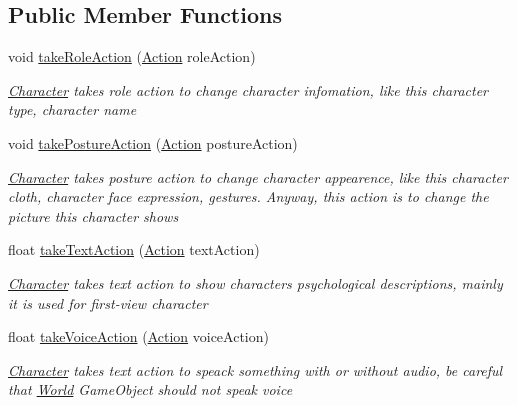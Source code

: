 \subsection*{Public Member Functions}
\begin{DoxyCompactItemize}
\item 
void \hyperlink{classdoki_unity_1_1_character_a512e836f353af09226ac163a7b64d734}{take\+Role\+Action} (\hyperlink{classdoki_script_setting_1_1_action}{Action} role\+Action)
\begin{DoxyCompactList}\small\item\em \hyperlink{classdoki_unity_1_1_character}{Character} takes role action to change character infomation, like this character type, character name \end{DoxyCompactList}\item 
void \hyperlink{classdoki_unity_1_1_character_ada30cfd909a5113bc9dab066ac27012d}{take\+Posture\+Action} (\hyperlink{classdoki_script_setting_1_1_action}{Action} posture\+Action)
\begin{DoxyCompactList}\small\item\em \hyperlink{classdoki_unity_1_1_character}{Character} takes posture action to change character appearence, like this character cloth, character face expression, gestures. Anyway, this action is to change the picture this character shows \end{DoxyCompactList}\item 
float \hyperlink{classdoki_unity_1_1_character_a70a55912f6b1dade38c0d4ca1be7c807}{take\+Text\+Action} (\hyperlink{classdoki_script_setting_1_1_action}{Action} text\+Action)
\begin{DoxyCompactList}\small\item\em \hyperlink{classdoki_unity_1_1_character}{Character} takes text action to show character\textquotesingle{}s psychological descriptions, mainly it is used for first-\/view character \end{DoxyCompactList}\item 
float \hyperlink{classdoki_unity_1_1_character_ad591f55d8a895627b424525dd145cd4b}{take\+Voice\+Action} (\hyperlink{classdoki_script_setting_1_1_action}{Action} voice\+Action)
\begin{DoxyCompactList}\small\item\em \hyperlink{classdoki_unity_1_1_character}{Character} takes text action to speack something with or without audio, be careful that \hyperlink{classdoki_unity_1_1_world}{World} Game\+Object should not speak voice \end{DoxyCompactList}\item 

\end{DoxyCompactItemize}
